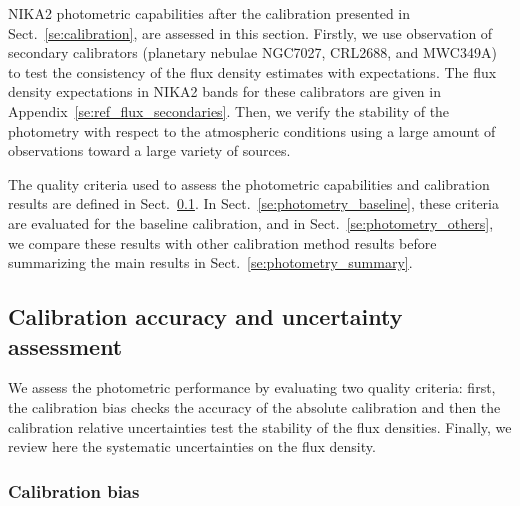 %

NIKA2 photometric capabilities after the calibration presented in
Sect.~\ref{se:calibration}, are assessed in this section. Firstly,
we use observation of secondary calibrators (planetary nebulae NGC7027, CRL2688, and
MWC349A) to test the consistency of the flux density estimates with
expectations. The flux density expectations
in NIKA2 bands for these calibrators are given in
Appendix~\ref{se:ref_flux_secondaries}. Then,
we verify the stability of the photometry with
respect to the atmospheric conditions using a large amount of
observations toward a large variety of sources. 

The quality criteria used to assess the photometric
capabilities and calibration results are defined in
Sect.~\ref{se:photometry_criteria}.
In Sect.~\ref{se:photometry_baseline}, these criteria are evaluated
for the baseline calibration, and in Sect.~\ref{se:photometry_others},
we compare these results with other calibration method results before
summarizing the main results in Sect.~\ref{se:photometry_summary}. 


\subsection{Calibration accuracy and uncertainty assessment}
\label{se:photometry_criteria}

We assess the photometric performance by evaluating two
quality criteria: first, the calibration bias checks the accuracy of
the absolute calibration and then the calibration relative
uncertainties test the stability of the flux densities. {\lp Finally,
we review here the systematic uncertainties on the flux density.}

\subsubsection{Calibration bias}
\label{se:def_calibration_bias}

